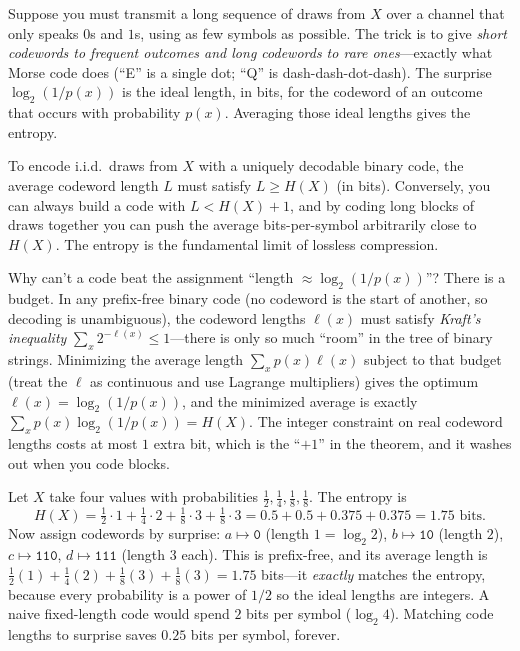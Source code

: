 \begin{intuitionbox}
Suppose you must transmit a long sequence of draws from $X$ over a channel that only speaks $0$s and $1$s,
using as few symbols as possible. The trick is to give \emph{short codewords to frequent outcomes and
long codewords to rare ones}---exactly what Morse code does (``E'' is a single dot; ``Q'' is dash-dash-dot-dash).
The surprise $\log_2(1/p(x))$ is the ideal length, in bits, for the codeword of an outcome
that occurs with probability $p(x)$. Averaging those ideal lengths gives the entropy.
\end{intuitionbox}

\begin{theorem}
\label{ch33:source-coding-thm}
To encode i.i.d.\ draws from $X$ with a uniquely decodable binary code, the average codeword length $L$
must satisfy $L \ge H(X)$ (in bits). Conversely, you can always build a code with $L < H(X) + 1$, and by
coding long blocks of draws together you can push the average bits-per-symbol arbitrarily close to
$H(X)$. The entropy is the fundamental limit of lossless compression.
\end{theorem}

\begin{walkbox}
Why can't a code beat the assignment ``length $\approx \log_2(1/p(x))$''? There is a budget. In any
prefix-free binary code (no codeword is the start of another, so decoding is unambiguous), the codeword
lengths $\ell(x)$ must satisfy \emph{Kraft's inequality} $\sum_x 2^{-\ell(x)} \le 1$---there is only so
much ``room'' in the tree of binary strings. Minimizing the average length $\sum_x p(x)\ell(x)$ subject to
that budget (treat the $\ell$ as continuous and use Lagrange multipliers) gives the optimum $\ell(x) =
\log_2(1/p(x))$, and the minimized average is exactly $\sum_x p(x)\log_2(1/p(x)) = H(X)$. The integer
constraint on real codeword lengths costs at most $1$ extra bit, which is the ``$+1$'' in the theorem, and
it washes out when you code blocks.
\end{walkbox}

\begin{example}
\label{ch33:huffman-example}
Let $X$ take four values with probabilities $\tfrac12, \tfrac14, \tfrac18, \tfrac18$. The entropy is
\[
  H(X) = \tfrac12\cdot 1 + \tfrac14\cdot 2 + \tfrac18\cdot 3 + \tfrac18\cdot 3
       = 0.5 + 0.5 + 0.375 + 0.375 = 1.75 \text{ bits.}
\]
Now assign codewords by surprise: $a \mapsto \texttt{0}$ (length $1 = \log_2 2$), $b \mapsto \texttt{10}$
(length $2$), $c \mapsto \texttt{110}$, $d \mapsto \texttt{111}$ (length $3$ each). This is prefix-free,
and its average length is $\tfrac12(1) + \tfrac14(2) + \tfrac18(3) + \tfrac18(3) = 1.75$ bits---it
\emph{exactly} matches the entropy, because every probability is a power of $1/2$ so the ideal lengths are
integers. A naive fixed-length code would spend $2$ bits per symbol ($\log_2 4$). Matching code lengths to
surprise saves $0.25$ bits per symbol, forever.
\end{example}


